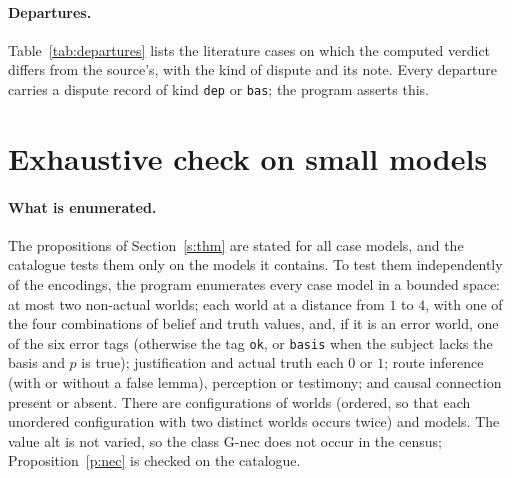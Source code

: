 \documentclass{situationist-preprint}
\begin{document}
\begin{table}[h]\caption{Rival conditions against the literature and against safety.}\label{tab:rivals}

\end{table}

\paragraph{Departures.} Table~\ref{tab:departures} lists the literature cases on which the computed verdict differs from the source's, with the kind of dispute and its note. Every departure carries a dispute record of kind \texttt{dep} or \texttt{bas}; the program asserts this.

\begin{table}[h]\caption{Departures from the sources' verdicts.}\label{tab:departures}

\end{table}

\section{Exhaustive check on small models}\label{app:e}

\paragraph{What is enumerated.} The propositions of Section~\ref{s:thm} are stated for all case models, and the catalogue tests them only on the models it contains. To test them independently of the encodings, the program enumerates every case model in a bounded space: at most two non-actual worlds; each world at a distance from $1$ to $4$, with one of the four combinations of belief and truth values, and, if it is an error world, one of the six error tags (otherwise the tag \texttt{ok}, or \texttt{basis} when the subject lacks the basis and $p$ is true); justification and actual truth each $0$ or $1$; route inference (with or without a false lemma), perception or testimony; and causal connection present or absent. There are \stcnconfigs{} configurations of worlds (ordered, so that each unordered configuration with two distinct worlds occurs twice) and \stcnmodels{} models. The value alt is not varied, so the class G-nec does not occur in the census; Proposition~\ref{p:nec} is checked on the catalogue.
\end{document}
